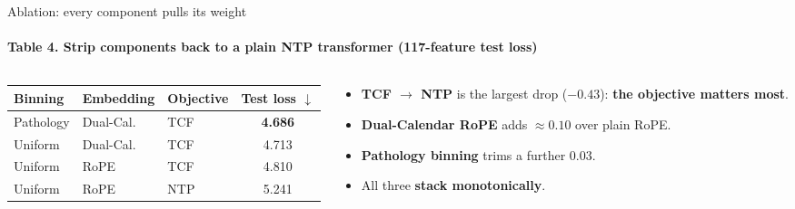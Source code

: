 \documentclass[10pt, aspectratio=169, t]{beamer}   %
\newcommand{\good}[1]{{\color{posblue}\bfseries #1}}  %
\begin{document}
\begin{frame}{Ablation: every component pulls its weight}
  \framesubtitle{Table 4. Strip components back to a plain NTP transformer (117-feature test loss)}
  \vfill
  \begin{columns}[c]
    \begin{column}{0.52\textwidth}
      \centering
      \renewcommand{\arraystretch}{1.35}
      \setlength{\tabcolsep}{6pt}
      \begin{tabular}{l l l c}
        \toprule
        \textbf{Binning} & \textbf{Embedding} & \textbf{Objective} & \textbf{Test loss} $\downarrow$\\
        \midrule
        \rowcolor{accent!12}
        Pathology & Dual-Cal.\ & TCF & \textbf{4.686}\\
        Uniform   & Dual-Cal.\ & TCF & 4.713\\
        Uniform   & RoPE       & TCF & 4.810\\
        Uniform   & RoPE       & NTP & 5.241\\
        \bottomrule
      \end{tabular}
    \end{column}
    \begin{column}{0.48\textwidth}
      \begin{itemize}\setlength{\itemsep}{12pt}
        \item \textbf{TCF $\to$ NTP} is the largest drop ($-0.43$): \good{the objective matters most}.
        \item \textbf{Dual-Calendar RoPE} adds $\approx 0.10$ over plain RoPE.
        \item \textbf{Pathology binning} trims a further $0.03$.
        \item All three \good{stack monotonically}.
      \end{itemize}
    \end{column}
  \end{columns}
  \vfill
\end{frame}
\end{document}
